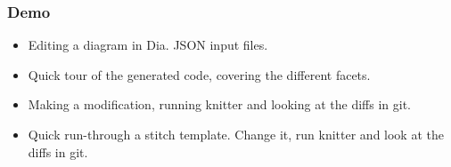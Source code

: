 \documentclass{beamer}
\begin{document}
\begin{frame}
\frametitle{Demo}

\begin{itemize}

\item Editing a diagram in Dia. JSON input files.

\pause

\item Quick tour of the generated code, covering the different
  facets.

\pause

\item Making a modification, running knitter and looking at the diffs
  in git.

\pause

\item Quick run-through a stitch template. Change it, run knitter and
  look at the diffs in git.

\end{itemize}

\end{frame}

\end{document}
